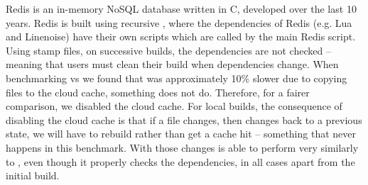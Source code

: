 Redis is an in-memory NoSQL database written in C, developed over the last 10 years. Redis is built using recursive \Make \cite{miller:recursive_make}, where the dependencies of Redis (e.g. Lua and Linenoise) have their own \Make scripts which are called by the main Redis \Make script. Using stamp files, on successive builds, the dependencies are not checked -- meaning that users must clean their build when dependencies change. When benchmarking \Rattle vs \Make we found that \Rattle was approximately 10\% slower due to copying files to the cloud cache, something \Make does not do. Therefore, for a fairer comparison, we disabled the cloud cache. For local builds, the consequence of disabling the cloud cache is that if a file changes, then changes back to a previous state, we will have to rebuild rather than get a cache hit -- something that never happens in this benchmark. With those changes \Rattle is able to perform very similarly to \Make, even though it properly checks the dependencies, in all cases apart from the initial build.

\begin{comment}
\subsection{Reimplementing Stack}

\Rattle assumes that each command is atomic - it cannot be subdivided into smaller parts. If a command is secretly two independent commands then they should usually be expressed as such so they can be individually skipped.

Compound commands: Sometimes a command will produce something that is user specific (not great for caching), but the next step will remove the user specificity (good for caching). To fix that we allow compound commands, by conjoining two commands with \texttt{\&\&}. Sometimes the sole purpose of the second command can be to strip machine-unique data from the first command.

As another example, the GHC package database has additional entries added every time a package is installed, making the output a consequence of the original file\footnote{As a consequence many build systems, including \Bazel and \Rattle, use multiple package databases with only one entry per database}.

and some memoisation operations (\texttt{memo})
\end{comment}

